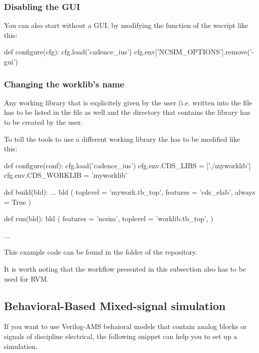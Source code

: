 \subsubsection{Disabling the  GUI}
You can also start  without a GUI, by modifying the 
function of the wscript like this:
\begin{lstwscript}
def configure(cfg):
    cfg.load('cadence_ius')
    cfg.env['NCSIM_OPTIONS'].remove('-gui')
\end{lstwscript}

\subsubsection{Changing the worklib's name}
Any working library that is explicitely given by the user (i.e. written into
the  file has to be listed in the  file as well and the
directory that contains the library has to be created by the user.

To tell the  tools to use a different working library the
 has to be modified like this:
\begin{lstwscript}
def configure(conf):
    cfg.load('cadence_ius')
    cfg.env.CDS_LIBS = ['./myworklib']
    cfg.env.CDS_WORKLIB = 'myworklib'

def build(bld):
    ...
    bld (
        toplevel = 'mywork.tb_top',
        features = 'cds_elab',
        always = True
    )

def run(bld):
    bld (
        features = 'ncsim',
        toplevel = 'worklib.tb_top',
    )

...
\end{lstwscript}
This example code can be found in the folder
 of the repository.

It is worth noting that the workflow presented in this subsection also has to
be used for \gls{RVM}.

\clearpage
\subsection{Behavioral-Based Mixed-signal simulation}
\label{sec:ius_behave_rtl}
If you want to use Verilog-AMS behaioral models that contain analog blocks or
signals of discipline electrical, the following  snippet can help
you to set up a simulation.


